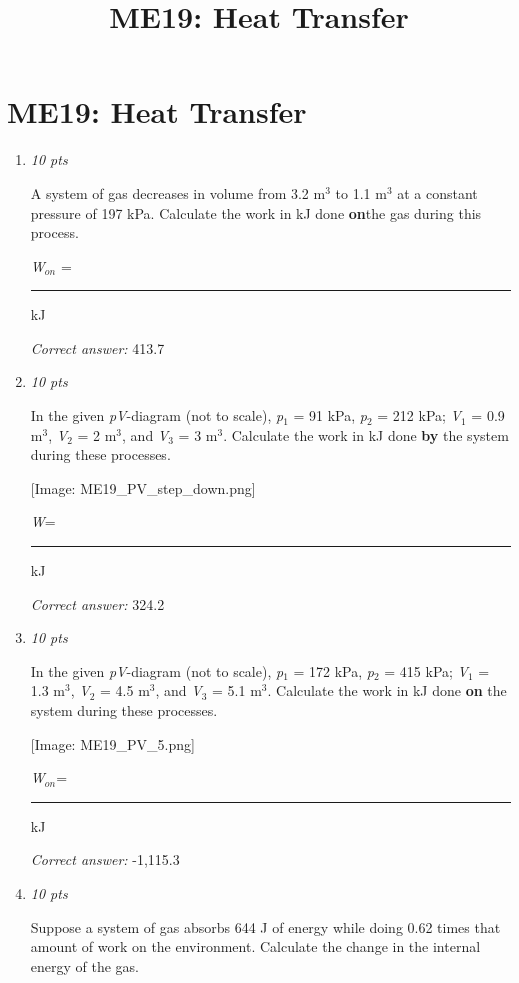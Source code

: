 \documentclass[11pt]{article}
\title{ME19: Heat Transfer}
\author{}
\date{}
\begin{document}
\maketitle

\section*{ME19: Heat Transfer}

\begin{enumerate}[leftmargin=*,label=\textbf{Question \arabic*.}]

\item \hfill \textit{10 pts}

A system of gas decreases in volume from 3.2 m$^{3}$ to 1.1 m$^{3}$ at a constant pressure of 197 kPa. Calculate the work in kJ done \textbf{on}the gas during this process.



\emph{W}$_{on}$ = \rule{2.5cm}{0.4pt} kJ

\textit{Correct answer:} 413.7

\item \hfill \textit{10 pts}

In the given \emph{pV}-diagram (not to scale), \emph{p}$_{1}$ = 91 kPa, \emph{p}$_{2}$ = 212 kPa; \emph{V}$_{1}$ = 0.9 m$^{3}$, \emph{V}$_{2}$ = 2 m$^{3}$, and \emph{V}$_{3}$ = 3 m$^{3}$. Calculate the work in kJ done \textbf{by} the system during these processes.

 [Image: ME19\_PV\_step\_down.png]



\emph{W}= \rule{2.5cm}{0.4pt} kJ

\textit{Correct answer:} 324.2

\item \hfill \textit{10 pts}

In the given \emph{pV}-diagram (not to scale), \emph{p}$_{1}$ = 172 kPa, \emph{p}$_{2}$ = 415 kPa; \emph{V}$_{1}$ = 1.3 m$^{3}$, \emph{V}$_{2}$ = 4.5 m$^{3}$, and \emph{V}$_{3}$ = 5.1 m$^{3}$. Calculate the work in kJ done \textbf{on} the system during these processes.

    [Image: ME19\_PV\_5.png]



\emph{W}$_{on}$\emph{}= \rule{2.5cm}{0.4pt} kJ

\textit{Correct answer:} -1,115.3

\item \hfill \textit{10 pts}

Suppose a system of gas absorbs 644 J of energy while doing 0.62 times that amount of work on the environment. Calculate the change in the internal energy of the gas.


\end{enumerate}
\end{document}
